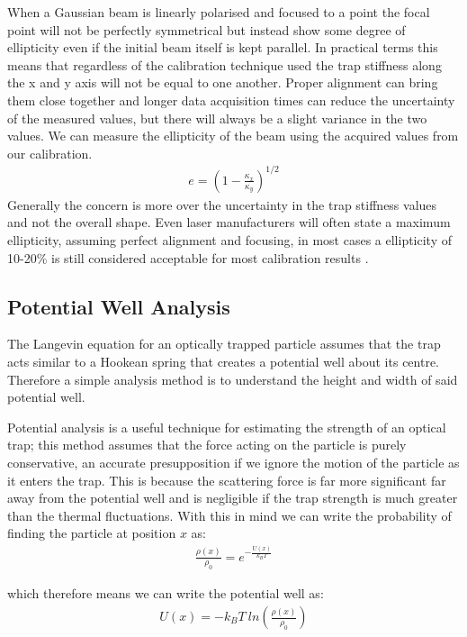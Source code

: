 When a Gaussian beam is linearly polarised and 
focused to a point the focal point will not be 
perfectly symmetrical but instead show some 
degree of ellipticity even if the initial beam 
itself is kept parallel. In practical terms this
means that regardless of the calibration 
technique used the trap stiffness along the x and
y axis will not be equal to one another. Proper
alignment can bring them close together and longer
data acquisition times can reduce the uncertainty of
the measured values, but there will always be a 
slight variance in the two values. We can measure
the ellipticity of the beam using the acquired values 
from our calibration.
\begin{align}
	e = \left(1-\frac{\kappa_x}{\kappa_y}\right)^{1/2}
\end{align}
Generally the concern is more over the uncertainty in 
the trap stiffness values and not the overall shape. 
Even laser manufacturers will often state a maximum
ellipticity, assuming perfect alignment and focusing, 
in most cases a ellipticity of 10-20\%  is still 
considered acceptable for most calibration results
\cite{BergSoerensen2004}.

\subsection{Potential Well Analysis}
The Langevin equation for an optically trapped particle assumes 
that the trap acts similar to a Hookean spring that creates a 
potential well about its centre. Therefore a simple analysis 
method is to understand the height and width of said potential well. 

Potential analysis is a useful technique for estimating the 
strength of an optical trap; this method assumes that the force 
acting on the particle is purely conservative, an accurate 
presupposition if we ignore the motion of the particle as it 
enters the trap. This is because the scattering force is far 
more significant far away from the potential well and is 
negligible if the trap strength is much greater than the thermal 
fluctuations. With this in mind we can write the probability of 
finding the particle at position $x$ as:
\begin{align}
	\frac{\rho(x)}{\rho_0} = e^{-\frac{U(x)}{k_{B}T}} 
\end{align}

which therefore means we can write the potential well as:
\begin{align}
	\label{eq:potential_well}
	U(x)=-k_BT\ ln\left(\frac{\rho(x)}{\rho_0} \right)
\end{align}

